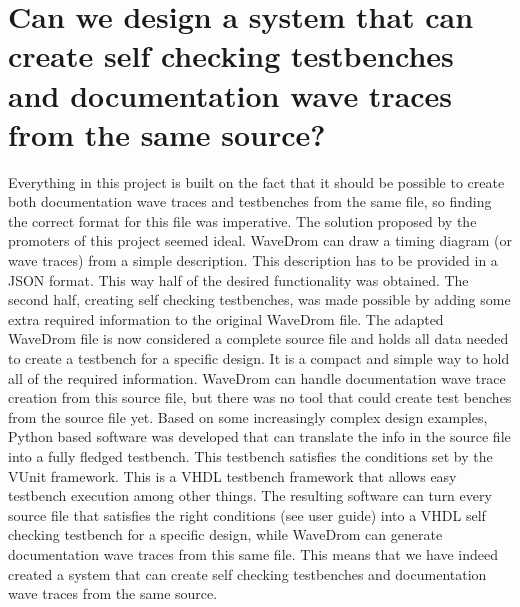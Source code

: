 \section{Can we design a system that can create self checking testbenches and documentation wave traces from the same source?}
Everything in this project is built on the fact that it should be possible to create both documentation wave traces and testbenches from the same file, so finding the correct format for this file was imperative. The solution proposed by the promoters of this project seemed ideal. WaveDrom can draw a timing diagram (or wave traces) from a simple description. This description has to be provided in a JSON format. This way half of the desired functionality was obtained. The second half, creating self checking testbenches, was made possible by adding some extra required information to the original WaveDrom file. The adapted WaveDrom file is now considered a complete source file and holds all data needed to create a testbench for a specific design. It is a compact and simple way to hold all of the required information.
\npar
WaveDrom can handle documentation wave trace creation from this source file, but there was no tool that could create test benches from the source file yet. Based on some increasingly complex design examples, Python based software was developed that can translate the info in the source file into a fully fledged testbench. This testbench satisfies the conditions set by the VUnit framework. This is a VHDL testbench framework that allows easy testbench execution among other things.
\npar
The resulting software can turn every source file that satisfies the right conditions (see user guide) into a VHDL self checking testbench for a specific design, while WaveDrom can generate documentation wave traces from this same file. This means that we have indeed created a system that can create self checking testbenches and documentation wave traces from the same source.

